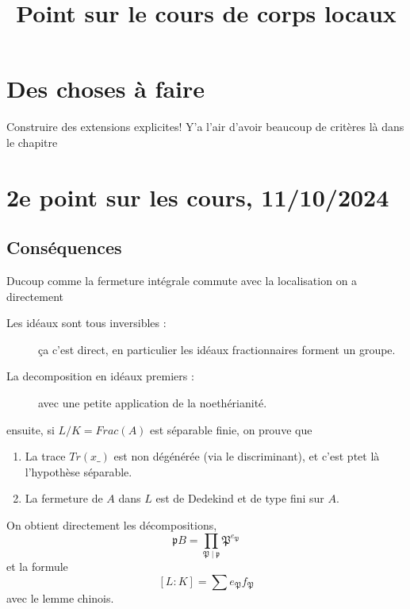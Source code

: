 \documentclass[a4paper,12pt]{book}
\title{Point sur le cours de corps locaux }
\date{}
\newcommand{\p}{\mathfrak p}
\theoremstyle{plain}
\theoremstyle{definition}
\theoremstyle{remark}
\begin{document}
\maketitle
\chapter{Des choses à faire}
Construire des extensions explicites! Y'a l'air d'avoir beaucoup de 
critères là dans le chapitre

\chapter{2e point sur les cours, 11/10/2024}

\section{Conséquences}
Ducoup comme la fermeture intégrale commute avec la localisation on
a directement 
\begin{description}
    \item[Les idéaux sont tous inversibles :] ça c'est direct, en 
	particulier les idéaux fractionnaires forment un groupe.
    \item[La decomposition en idéaux premiers :] avec une petite 
	application de la noethérianité.
\end{description}
ensuite, si $L/K=Frac(A)$ est séparable finie, on prouve que 
\begin{enumerate}
    \item La trace $Tr(x\_)$ est non dégénérée (via le discriminant),
	et c'est ptet là l'hypothèse séparable.
    \item La fermeture de $A$ dans $L$ est de Dedekind et de type fini 
	sur $A$.
\end{enumerate}
On obtient directement les décompositions, 
\[\p B=\prod_{\mathfrak P\mid \p} \mathfrak P^{e_{\mathfrak P}}\]
et la formule 
\[[L:K]=\sum e_{\mathfrak P}f_{\mathfrak P}\]
avec le lemme chinois.
\end{document}
